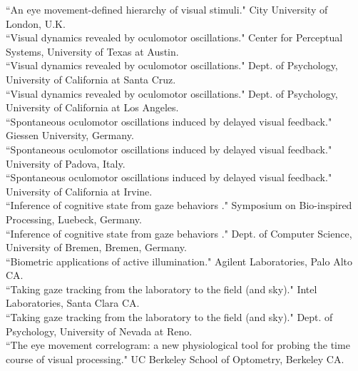 \documentclass[12pt]{article}
\newcommand{\years}[1]{\marginnote{\scriptsize #1}}
\begin{document}
\years{2011}
``An eye movement-defined hierarchy of visual stimuli."  City University of London, U.K.\\

\years{2010}
``Visual dynamics revealed by oculomotor oscillations."  Center for Perceptual Systems, University of Texas at Austin.\\

``Visual dynamics revealed by oculomotor oscillations."  Dept. of Psychology, University of California at Santa Cruz.\\

\years{2008}
``Visual dynamics revealed by oculomotor oscillations."  Dept. of Psychology, University of California at Los Angeles.\\

\years{2007}
``Spontaneous oculomotor oscillations induced by delayed visual feedback."  Giessen University, Germany.\\

``Spontaneous oculomotor oscillations induced by delayed visual feedback."  University of Padova, Italy.\\

``Spontaneous oculomotor oscillations induced by delayed visual feedback."  University of California at Irvine.\\

\years{2005}
``Inference of cognitive state from gaze behaviors ."  Symposium on Bio-inspired Processing, Luebeck, Germany.\\

``Inference of cognitive state from gaze behaviors ."  Dept. of Computer Science, University of Bremen, Bremen, Germany.\\

``Biometric applications of active illumination."  Agilent Laboratories, Palo Alto CA.\\

``Taking gaze tracking from the laboratory to the field (and sky)."  Intel Laboratories, Santa Clara CA.\\

``Taking gaze tracking from the laboratory to the field (and sky)."  Dept. of Psychology, University of Nevada at Reno.\\

\years{2003}
``The eye movement correlogram:  a new physiological tool for probing the time course of visual processing."  UC Berkeley School of Optometry, Berkeley CA.\\
\end{document}
